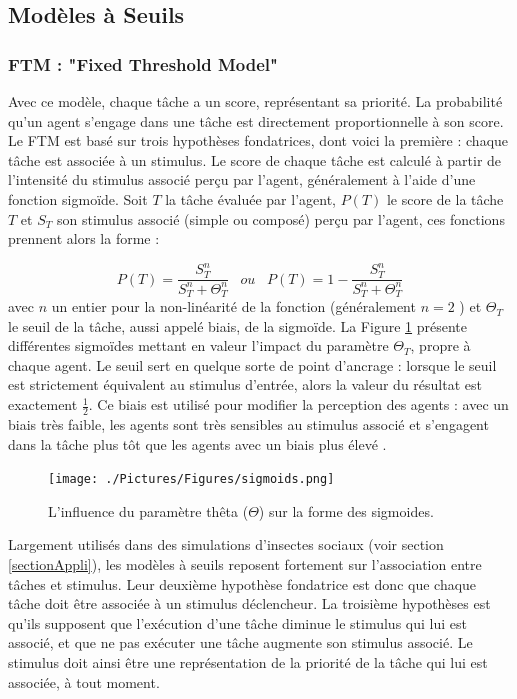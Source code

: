         
		\subsection{Modèles à Seuils}
		\label{subsectionRTM}
		\subsubsection{FTM : "Fixed Threshold Model" \cite{bonabeau_natural_1999}}
        Avec ce modèle, chaque tâche a un score, représentant sa priorité. La probabilité qu'un agent s'engage dans une tâche est directement proportionnelle à son score. Le FTM est basé sur trois hypothèses fondatrices, dont voici la première : chaque tâche est associée à un stimulus. Le score de chaque tâche est calculé à partir de l'intensité du stimulus associé perçu par l'agent, généralement à l'aide d'une fonction sigmoïde. Soit $T$ la tâche évaluée par l'agent, $P(T)$ le score de la tâche $T$ et $S_T$ son stimulus associé (simple ou composé) perçu par l'agent, ces fonctions prennent alors la forme :
			
\begin{equation}
\label{equationSigmoid}
	P(T) = \frac{S_T^n}{S_T^n + \Theta_T^n} \;\;\; ou \;\;\; P(T) = 1 - \frac{S_T^n}{S_T^n + \Theta_T^n}
\end{equation}	
 avec $n$ un entier pour la non-linéarité de la fonction (généralement $n=2$ \cite{schmickl_taskselsim_2008, gautrais_emergent_2002}) et $\Theta_T$ le seuil de la tâche, aussi appelé biais, de la sigmoïde. La Figure \ref{sigmoids} présente différentes sigmoïdes mettant en valeur l'impact du paramètre $\Theta_T$, propre à chaque agent. Le seuil sert en quelque sorte de point d'ancrage : lorsque le seuil est strictement équivalent au stimulus d'entrée, alors la valeur du résultat est exactement $\frac{1}{2}$. Ce biais est utilisé pour modifier la perception des agents : avec un biais très faible, les agents sont très sensibles au stimulus associé et s'engagent dans la tâche plus tôt que les agents avec un biais plus élevé \cite{dornhaus_task_1998}.
		
		\begin{figure}
		\centering
		\texttt{[image: ./Pictures/Figures/sigmoids.png]}
		\caption{L'influence du paramètre thêta ($\Theta$) sur la forme des sigmoides.}
		\label{sigmoids}
		\end{figure}
        
        Largement utilisés dans des simulations d'insectes sociaux (voir section \ref{sectionAppli}), les modèles à seuils reposent fortement sur l'association entre tâches et stimulus. Leur deuxième hypothèse fondatrice est donc que chaque tâche doit être associée à un stimulus déclencheur. La troisième hypothèses est qu'ils supposent que l'exécution d'une tâche diminue le stimulus qui lui est associé, et que ne pas exécuter une tâche augmente son stimulus associé. Le stimulus doit ainsi être une représentation de la priorité de la tâche qui lui est associée, à tout moment. 
        

